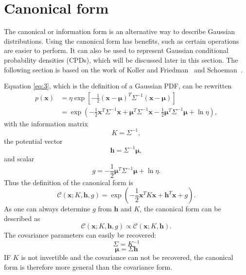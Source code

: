 \documentclass[12pt,oneside,openany,a4paper, %
afrikaans,english,
]{memoir}
\numberwithin{equation}{chapter}
\begin{document}
\section{Canonical form}
The canonical or information form is an alternative way to describe Gaussian distributions. Using the canonical form has benefits, such as certain operations are easier to perform. It can also be used to represent Gaussian conditional probability densities (CPDs), which will be discussed later in this section. The following section is based on the work of Koller and Friedman~\cite{koller} and Schoeman~\citep{JC}.

Equation \ref{eq:3}, which is the definition of a Gaussian PDF, can be rewritten
\begin{equation}
\begin{split}\label{eq:6}
p(\bm{x}) & = \eta\exp\left[-\frac{1}{2}(\bm{x}-\bm{\mu})^T\Sigma^{-1}(\bm{x}-\bm{\mu})\right]\\
& = \exp\left(-\frac{1}{2}\bm{x}^T\Sigma^{-1}\bm{x} + \bm{\mu}^T\Sigma^{-1}\bm{x} - \frac{1}{2}\bm{\mu}^T\Sigma^{-1}\bm{\mu} + \ln{\eta}\right),
\end{split}
\end{equation}
with the information matrix
\begin{equation}\label{eq:7}
K = \Sigma^{-1},
\end{equation}
the potential vector
\begin{equation}\label{eq:8}
\bm{h} = \Sigma^{-1}\bm{\mu},
\end{equation}
and scalar
\begin{equation}\label{eq:9}
g = - \frac{1}{2}\bm{\mu}^T\Sigma^{-1}\bm{\mu} + \ln{\eta}.
\end{equation}
Thus the definition of the canonical form is
\begin{equation}\label{eq:canonical}
\mathcal{C}(\bm{x}; K,\bm{h},g) = \exp\left(-\frac{1}{2}\bm{x}^TK\bm{x} + \bm{h}^T\bm{x} +g \right).
\end{equation}
As one can always determine $g$ from $\bm{h}$ and $K$, the canonical form can be described as
\begin{equation}
\mathcal{C}(\bm{x}; K,\bm{h},g) \propto \mathcal{C}(\bm{x}; K,\bm{h}).
\end{equation}
The covariance parameters can easily be recovered:
\begin{equation}
\Sigma = K^{-1}
\end{equation}
\begin{equation}
\bm{\mu} = \Sigma\bm{h}
\end{equation}
IF $K$ is not invertible and the covariance can not be recovered, the canonical form is therefore more general than the covariance form.
\end{document}
